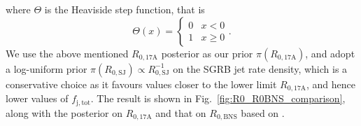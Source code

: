 \documentclass[]{aa}
\newcommand{\resp}[1]{#1}
\begin{document}
where $\Theta$ is the Heaviside step function, that is 
\begin{equation}
 \Theta(x) = \left\lbrace\begin{array}{lr}
                          0 & x<0\\
                          1 & x\geq 0
                         \end{array}\right..
\end{equation}
We use the \resp{above mentioned} $R_\mathrm{0,17A}$ posterior as our prior $\pi(R_\mathrm{0,17A})$, and \resp{adopt} a log-uniform \resp{prior} $\pi(R_\mathrm{0,SJ})\propto R_\mathrm{0,SJ}^{-1}$ \resp{on the SGRB jet rate density, which is a conservative choice as it favours values closer to the lower limit $R_\mathrm{0,17A}$, and hence lower values of $f_\mathrm{j,tot}$. The result is shown in Fig.~\ref{fig:R0_R0BNS_comparison}, along with the posterior on $R_\mathrm{0,17A}$ and that on $R_\mathrm{0,BNS}$ based on \citet{Grunthal2021}.}
\end{document}
